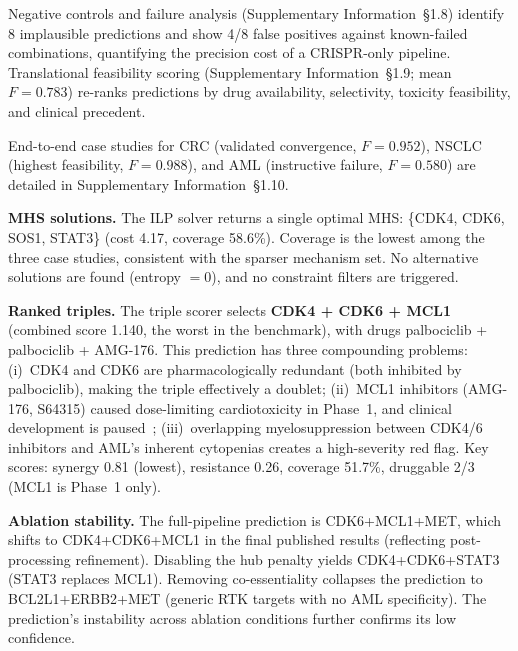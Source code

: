 \documentclass[times, twoside, watermark]{zHenriquesLab-StyleBioRxiv}
\begin{document}
Negative controls and failure analysis (Supplementary Information~\S1.8) identify 8 implausible predictions and show 4/8 false positives against known-failed combinations, quantifying the precision cost of a CRISPR-only pipeline. Translational feasibility scoring (Supplementary Information~\S1.9; mean $F = 0.783$) re-ranks predictions by drug availability, selectivity, toxicity feasibility, and clinical precedent.

End-to-end case studies for CRC (validated convergence, $F = 0.952$), NSCLC (highest feasibility, $F = 0.988$), and AML (instructive failure, $F = 0.580$) are detailed in Supplementary Information~\S1.10.









\textbf{MHS solutions.} The ILP solver returns a single optimal MHS: \{CDK4, CDK6, SOS1, STAT3\} (cost 4.17, coverage 58.6\%). Coverage is the lowest among the three case studies, consistent with the sparser mechanism set. No alternative solutions are found (entropy $= 0$), and no constraint filters are triggered.

\textbf{Ranked triples.} The triple scorer selects \textbf{CDK4 + CDK6 + MCL1} (combined score 1.140, the worst in the benchmark), with drugs palbociclib + palbociclib + AMG-176. This prediction has three compounding problems: (i)~CDK4 and CDK6 are pharmacologically redundant (both inhibited by palbociclib), making the triple effectively a doublet; (ii)~MCL1 inhibitors (AMG-176, S64315) caused dose-limiting cardiotoxicity in Phase~1, and clinical development is paused~\cite{Caenepeel2018}; (iii)~overlapping myelosuppression between CDK4/6 inhibitors and AML's inherent cytopenias creates a high-severity red flag. Key scores: synergy 0.81 (lowest), resistance 0.26, coverage 51.7\%, druggable 2/3 (MCL1 is Phase~1 only).

\textbf{Ablation stability.} The full-pipeline prediction is CDK6+MCL1+MET, which shifts to CDK4+CDK6+MCL1 in the final published results (reflecting post-processing refinement). Disabling the hub penalty yields CDK4+CDK6+STAT3 (STAT3 replaces MCL1). Removing co-essentiality collapses the prediction to BCL2L1+ERBB2+MET (generic RTK targets with no AML specificity). The prediction's instability across ablation conditions further confirms its low confidence.
\end{document}
